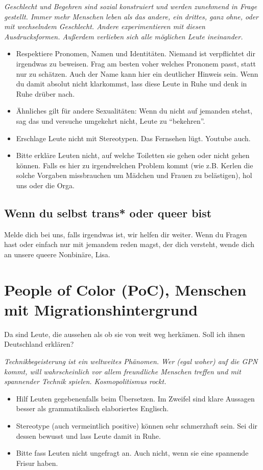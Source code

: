 \documentclass[10pt,notumble]{leaflet}
\newcommand\dos{\item[$+$]}
\newcommand\donts{\item[$-$]}
\begin{document}
\emph{Geschlecht und Begehren sind sozial konstruiert und werden
  zunehmend in Frage gestellt. Immer mehr Menschen leben als das
  andere, ein drittes, ganz ohne, oder mit wechselndem
  Geschlecht. Andere experimentieren mit diesen
  Ausdrucksformen. Außerdem verlieben sich alle möglichen Leute
  ineinander.}
\label{sec-5-1}
\begin{itemize}
\dos Respektiere Pronomen, Namen und Identitäten. Niemand ist
  verpflichtet dir irgendwas zu beweisen. Frag am besten voher welches
  Prononem passt, statt nur zu schätzen. Auch der Name kann hier ein
  deutlicher Hinweis sein. Wenn du damit absolut nicht klarkommst,
  lass diese Leute in Ruhe und denk in Ruhe drüber nach.
\dos Ähnliches gilt für andere Sexualitäten: Wenn du nicht auf
  jemanden stehst, sag das und versuche umgekehrt nicht, Leute zu
  ``bekehren''.
\donts Erschlage Leute nicht mit Stereotypen. Das Fernsehen
  lügt. Youtube auch.
\donts Bitte erkläre Leuten nicht, auf welche Toiletten sie gehen oder
  nicht gehen können. Falls es hier zu irgendwelchen Problem kommt
  (wie z.B. Kerlen die solche Vorgaben missbrauchen um Mädchen und Frauen
  zu belästigen), hol uns oder die Orga.
\end{itemize}
\subsection{Wenn du selbst trans* oder queer bist}
Melde dich bei uns, falls irgendwas ist, wir helfen dir weiter. Wenn
du Fragen hast oder einfach nur mit jemandem reden magst, der dich
versteht, wende dich an unsere queere Nonbinäre, Lisa.




\section{People of Color (PoC), Menschen mit
  Migrationshintergrund}
\label{sec-4}
Da sind Leute, die aussehen als ob sie von weit weg herkämen. Soll ich
ihnen Deutschland erklären?

\emph{Technikbegeisterung ist ein weltweites Phänomen. Wer (egal
  woher) auf die GPN kommt, will wahrscheinlich vor allem freundliche
  Menschen treffen und mit spannender Technik spielen.
  Kosmopolitismus rockt.}
\label{sec-4-2}
\begin{itemize}
\dos Hilf Leuten gegebenenfalls beim Übersetzen. Im Zweifel sind
  klare Aussagen besser als grammatikalisch elaboriertes Englisch.
\donts Stereotype (auch vermeintlich positive) können sehr schmerzhaft
  sein. Sei dir dessen bewusst und lass Leute damit in Ruhe.
\donts Bitte fass Leuten nicht ungefragt an. Auch nicht, wenn sie eine
  spannende Frisur haben.
\end{itemize}
\end{document}
